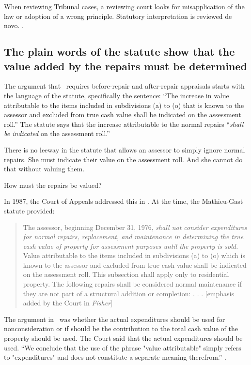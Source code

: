 \documentclass[12pt,\documentclassflag]{michiganCourtOfAppealsBrief}
\begin{document}
When reviewing Tribunal cases, a reviewing court looks for misapplication of the law or adoption of a wrong principle. Statutory interpretation is reviewed de novo. . 

\subsection{The plain words of the statute show that the value added by the repairs must be determined}

The argument that \mathieuGast\ requires before-repair and after-repair appraisals starts with the language of the statute, specifically the sentence: ``The increase in value attributable to the items included in subdivisions (a) to (o) that is known to the assessor and excluded from true cash value shall be indicated on the assessment roll.'' The statute says that the increase attributable to the normal repairs ``\emph{shall be indicated} on the assessment roll.''

There is no leeway in the statute that allows an assessor to simply ignore normal repairs. She must indicate their value on the assessment roll. And she cannot do that without valuing them.

How must the repairs be valued?

In 1987, the Court of Appeals addressed this in \cite{Fisher}. At the time, the Mathieu-Gast statute provided:

\begin{quote}
The assessor, beginning December 31, 1976, \emph{shall not consider expenditures for normal repairs, replacement, and maintenance in determining the true cash value of property for assessment purposes until the property is sold.} Value attributable to the items included in subdivisions (a) to (o) which is known to the assessor and excluded from true cash value shall be indicated on the assessment roll. This subsection shall apply only to residential property. The following repairs shall be considered normal maintenance if they are not part of a structural addition or completion: . . .
[emphasis added by the Court in \emph{Fisher}]
\end{quote}

The argument in \cite[s]{Fisher}\ was whether the actual expenditures should be used for nonconsideration or if should be 
the contribution to the total cash value of the property should be used. The Court said that the actual expenditures should be used. ``We conclude that the use of the phrase "value attributable" simply refers to "expenditures" and does not constitute a separate meaning therefrom.'' . 
\end{document}
